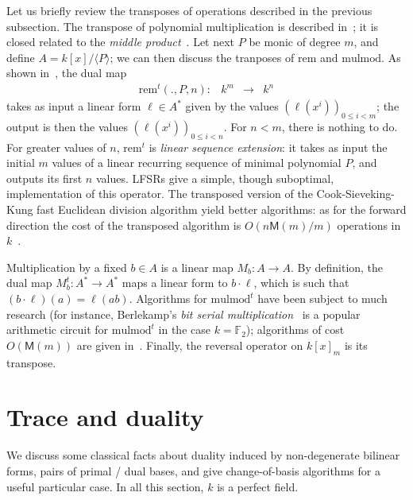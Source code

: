 \documentclass{sig-alternate}
\def\M {\ensuremath{\mathsf{M}}}
\def\F {\ensuremath{\mathbb{F}}}
\def\rem {\ensuremath{\mathrm{rem}}}
\def\mulmod {\ensuremath{\mathrm{mulmod}}}
\newcounter{algo}
\newcommand{\ang}[1]{\langle#1\rangle}
\begin{document}
Let us briefly review the transposes of operations described in the
previous subsection. The transpose of polynomial multiplication is
described in~\cite{bostan+lecerf+schost:tellegen}; it is closed
related to the {\em middle product}~\cite{hanrot+quercia+zimmermann}.
Let next $P$ be monic of degree $m$, and define $A=k[x]/\ang{P}$; we
can then discuss the tranposes of $\rem$ and $\mulmod$. As shown
in~\cite{bostan+lecerf+schost:tellegen}, the dual map
$$
\begin{array}{cccc}
\rem^t(.,P,n): &k^m& \to &k^n
\end{array}$$ 
takes as input a linear form $\ell\in A^\ast$ given by the values
$(\ell(x^i))_{0 \le i < m}$; the output is then the values
$(\ell(x^i))_{0 \le i < n}$. For $n < m$, there is nothing to do. For
greater values of $n$, $\rem^t$ is \emph{linear sequence extension}:
it takes as input the initial $m$ values of a linear recurring
sequence of minimal polynomial $P$, and outputs its first $n$ values.
LFSRs give a simple, though suboptimal, implementation of this
operator. The transposed version of the Cook-Sieveking-Kung fast
Euclidean division algorithm yield better algorithms: as for the
forward direction the cost of the transposed algorithm is
$O(n\M(m)/m)$ operations in $k$~\cite{vzgathen+shoup92:journal,shoup99}.

Multiplication by a fixed $b\in A$ is a linear map $M_b:A\to A$. By
definition, the dual map $M_b^t: A^* \to A^*$ maps a linear form to $b
\cdot \ell$, which is such that $(b \cdot \ell)(a)
=\ell(ab)$. Algorithms for $\mulmod^t$ have been subject to much
research (for instance, Berlekamp's \emph{bit serial
  multiplication}~\cite{Berlekamp82} is a popular arithmetic circuit
for $\mulmod^t$ in the case $k=\F_2$); algorithms of cost $O(\M(m))$
are given in~\cite{shoup99,bostan+lecerf+schost:tellegen}. Finally,
the reversal operator on $k[x]_m$ is its transpose.


\section{Trace and duality}

We discuss some classical facts about duality induced by
non-degenerate bilinear forms, pairs of primal / dual bases, and give
change-of-basis algorithms for a useful particular case. In all this
section, $k$ is a perfect field.
\end{document}

